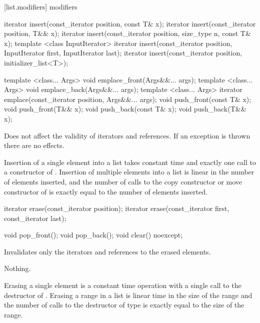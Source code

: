 [list.modifiers]{ modifiers}

%
\begin{itemdecl}
iterator insert(const_iterator position, const T& x);
iterator insert(const_iterator position, T&& x);
iterator insert(const_iterator position, size_type n, const T& x);
template <class InputIterator>
  iterator insert(const_iterator position, InputIterator first,
                  InputIterator last);
iterator insert(const_iterator position, initializer_list<T>);

template <class... Args> void emplace_front(Args&&... args);
template <class... Args> void emplace_back(Args&&... args);
template <class... Args> iterator emplace(const_iterator position, Args&&... args);
void push_front(const T& x);
void push_front(T&& x);
void push_back(const T& x);
void push_back(T&& x);
\end{itemdecl}

\begin{itemdescr}
\pnum
\remarks
Does not affect the validity of iterators and references.
If an exception is thrown there are no effects.

\pnum
\complexity
Insertion of a single element into a list takes constant time and
exactly one call to a constructor of
. Insertion of multiple elements into a list is linear in the
number of elements inserted, and the number of calls to the copy
constructor or move constructor of  is exactly equal
to the number of elements inserted.
\end{itemdescr}

%
\begin{itemdecl}
iterator erase(const_iterator position);
iterator erase(const_iterator first, const_iterator last);

void pop_front();
void pop_back();
void clear() noexcept;
\end{itemdecl}

\begin{itemdescr}
\pnum
\effects
Invalidates only the iterators and references to the erased elements.

\pnum
\throws Nothing.

\pnum
\complexity
Erasing a single element is a constant time operation with a single call to the destructor of
.
Erasing a range in a list is linear time in the
size of the range and the number of calls to the destructor of type
is exactly equal to the size of the range.
\end{itemdescr}

